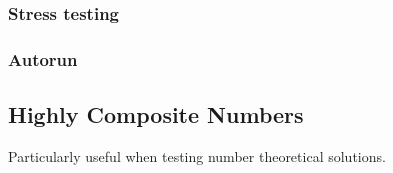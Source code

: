 \subsubsection{Stress testing}

\subsubsection{Autorun}

\subsection{Highly Composite Numbers}
Particularly useful when testing number theoretical solutions.





